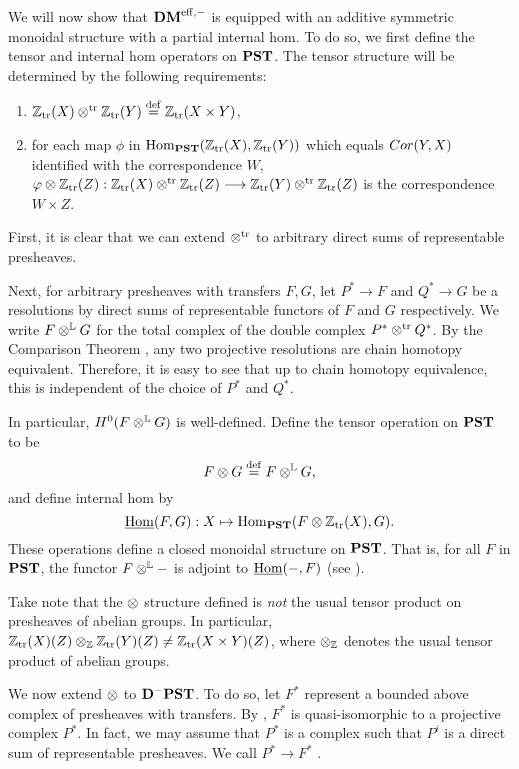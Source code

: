 We will now show that $\DMeff$ is equipped with an additive 
symmetric monoidal structure with a partial internal hom. To do 
so, we first define the tensor and internal hom operators on 
$\PST$. The tensor structure will be determined by the following 
requirements: 

\begin{enumerate}
\item $\Ztr(X) \ttr \Ztr(Y) \defeq \Ztr(X \times Y)$, 

\item for each map $\phi$ in $\hom_{\PST}(\Ztr(X), \Ztr(Y))$ which
equals $\Cor(Y, X)$ identified with the correspondence $W$, $\phi 
\tensor \Ztr(Z): \Ztr(X) \ttr \Ztr(Z) \to \Ztr(Y) \ttr \Ztr(Z)$ is 
the correspondence $W \times Z$. 
\end{enumerate}

First, it is clear that we can extend $\ttr$ to arbitrary 
direct sums of representable presheaves.  

Next, for arbitrary presheaves with transfers $F, G$, let $P^* \to 
F$ and $Q^* \to G$ be a resolutions by direct sums of 
representable functors of $F$ and $G$ respectively. We write $F 
\tL G$ for the total complex of the double complex $P^* \ttr Q^*$. 
By the Comparison Theorem \cite[2.26]{WH}, any two projective 
resolutions are chain homotopy equivalent. Therefore, it is easy 
to see that up to chain homotopy equivalence, this is independent 
of the choice of $P^*$ and $Q^*$.

In particular, $H^0(F \tL G)$ is well-defined. Define the tensor 
operation on $\PST$ to be
\[
F \tensor G \defeq F \tL G,
\]
and define internal hom by
\[
\ihom(F, G): X \mapsto \hom_{\PST}(F \tensor \Ztr(X), G).
\]
These operations define a closed monoidal structure on $\PST$.
That is, for all $F$ in $\PST$, the functor $F \tL -$ is adjoint to 
$\ihom(-, F)$ (see \cite[8.3]{MVW}).

\begin{rmk}
Take note that the $\tensor$ structure defined is \emph{not} the
usual tensor product on presheaves of abelian groups. In 
particular, $\Ztr(X)(Z) \tensor_{\Z} \Ztr(Y)(Z) \neq 
\Ztr(X \times Y)(Z)$, where $\tensor_{\Z}$ denotes the usual 
tensor product of abelian groups.
\end{rmk}

We now extend $\tensor$ to $\DCat[D]^-\PST$. To do so, let $F^*$ 
represent a bounded above complex of presheaves with transfers.
By \cite[10.5.6]{WH}, $F^*$ is quasi-isomorphic to a projective 
complex $P^*$. In fact, we may assume that $P^*$ is a complex such 
that $P^i$ is a direct sum of representable presheaves. We call 
$P^* \to F^*$ .

